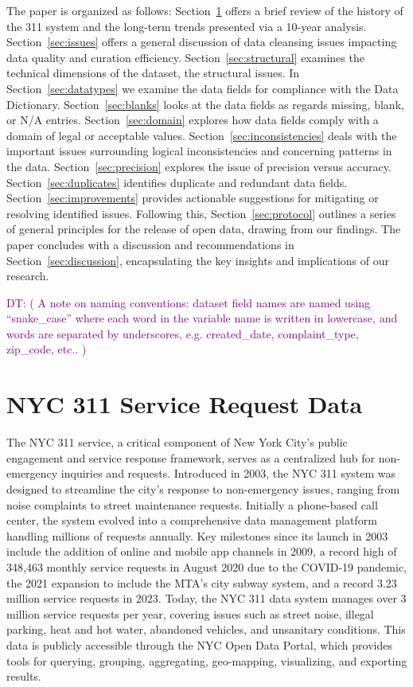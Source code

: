 \documentclass[12pt, titlepage]{article}
\newcommand{\dt}[1]{\textcolor{purple}{DT: (#1)}}
\begin{document}
The paper is organized as follows:
Section~\ref{sec:data} offers a brief review of the history of the 311
system and the long-term trends presented via a 10-year analysis.
Section~\ref{sec:issues} offers a 
general discussion of data cleansing issues impacting data 
quality and curation efficiency. Section~\ref{sec:structural} examines
the technical dimensions of the dataset, the structural issues. 
In Section~\ref{sec:datatypes} we examine the data fields for compliance 
with the Data Dictionary. Section~\ref{sec:blanks} looks at the 
data fields as regards missing, blank, or N/A entries. Section~\ref{sec:domain} 
explores how data fields comply with a domain of legal 
or acceptable values. Section~\ref{sec:inconsistencies} deals 
with the important issues surrounding logical inconsistencies 
and concerning patterns in the data. Section~\ref{sec:precision} 
explores the issue of precision versus accuracy. Section~\ref{sec:duplicates}
identifies duplicate and redundant data fields. Section~\ref{sec:improvements} provides 
actionable suggestions for mitigating or resolving identified issues. 
Following this, Section~\ref{sec:protocol} outlines a series of general 
principles for the release of open data, drawing from our findings. The 
paper concludes with a discussion and recommendations in 
Section~\ref{sec:discussion}, encapsulating the key insights and 
implications of our research.

\dt{
A note on naming conventions: dataset field names are named 
using ``snake\_case'' where each word in the variable name 
is written in lowercase, and words are separated by 
underscores, e.g. created\_date, complaint\_type, zip\_code, etc..   
}


\section{NYC 311 Service Request Data} 
\label{sec:data}

The NYC 311 service, a critical component of New York City's public
engagement and service response framework, serves as a centralized hub
for non-emergency inquiries and requests. Introduced in 2003, the NYC
311 system was designed to streamline the city's response to
non-emergency issues, ranging from noise complaints to street
maintenance requests. Initially a phone-based call center, the system
evolved into a comprehensive data management platform handling
millions of requests annually. Key milestones since its launch in 2003
include the addition of online and mobile app channels in 2009, a
record high of 348,463 monthly service requests in August 2020 due to
the COVID-19 pandemic, the 2021 expansion to include the MTA's city
subway system, and a record 3.23 million service requests in
2023. Today, the NYC 311 data system manages over 3 million service
requests per year, covering issues such as street noise, illegal
parking, heat and hot water, abandoned vehicles, and unsanitary
conditions. This data is publicly accessible through the NYC Open Data
Portal, which provides tools for querying, grouping, aggregating,
geo-mapping, visualizing, and exporting results.
\end{document}
